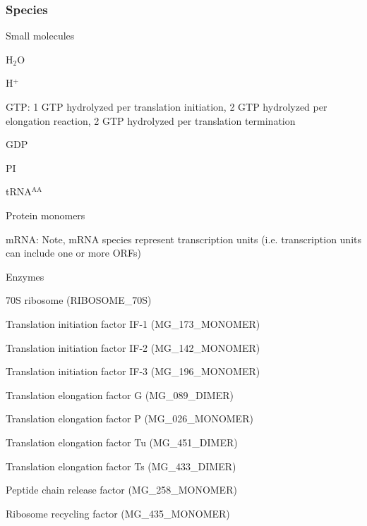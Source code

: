 \documentclass[10pt]{article}
\begin{document}
\subsubsection{Species}
\begin{compactitem}
\item Small molecules
    \begin{compactitem}
    \item H$_\text{2}$O
    \item H$^\text{+}$
    \item GTP: 1 GTP hydrolyzed per translation initiation, 2 GTP hydrolyzed per elongation reaction, 2 GTP hydrolyzed per translation termination
    \item GDP
    \item PI    
    \end{compactitem}
\item tRNA$^\text{AA}$
\item Protein monomers
\item mRNA: Note, mRNA species represent transcription units (i.e. transcription units can include one or more ORFs)
\item Enzymes
    \begin{compactitem}
    \item 70S ribosome (RIBOSOME\_70S)
    \item Translation initiation factor IF-1 (MG\_173\_MONOMER)
    \item Translation initiation factor IF-2 (MG\_142\_MONOMER)
    \item Translation initiation factor IF-3 (MG\_196\_MONOMER)
    \item Translation elongation factor G (MG\_089\_DIMER)
    \item Translation elongation factor P (MG\_026\_MONOMER)
    \item Translation elongation factor Tu (MG\_451\_DIMER)
    \item Translation elongation factor Ts (MG\_433\_DIMER)
    \item Peptide chain release factor (MG\_258\_MONOMER)
    \item Ribosome recycling factor (MG\_435\_MONOMER)
    \end{compactitem}
\end{compactitem}
\end{document}
